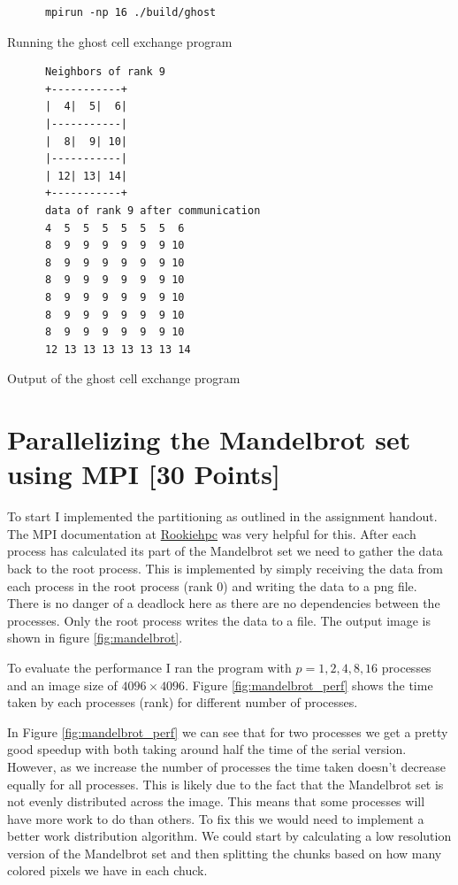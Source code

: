 \documentclass[unicode,11pt,a4paper,oneside,numbers=endperiod,openany]{scrartcl}
\begin{document}
\begin{listing}[h!t]
      \begin{verbatim}
      mpirun -np 16 ./build/ghost
      \end{verbatim}
      \caption{Running the ghost cell exchange program}
      \label{lst:ghost_run}
\end{listing}

\begin{listing}[h!t]
      \begin{verbatim}
      Neighbors of rank 9
      +-----------+
      |  4|  5|  6|
      |-----------|
      |  8|  9| 10|
      |-----------|
      | 12| 13| 14|
      +-----------+
      data of rank 9 after communication
      4  5  5  5  5  5  5  6 
      8  9  9  9  9  9  9 10 
      8  9  9  9  9  9  9 10 
      8  9  9  9  9  9  9 10 
      8  9  9  9  9  9  9 10 
      8  9  9  9  9  9  9 10 
      8  9  9  9  9  9  9 10 
      12 13 13 13 13 13 13 14 
      \end{verbatim}
      \caption{Output of the ghost cell exchange program}
      \label{lst:ghost_output}
\end{listing}


\section{Parallelizing the Mandelbrot set using MPI [30 Points]}

To start I implemented the partitioning as outlined in the assignment handout. The MPI documentation at \href{https://rookiehpc.org/mpi/docs/}{Rookiehpc} was very helpful for this. After each process has calculated its part of the Mandelbrot set we need to gather the data back to the root process. This is implemented by simply receiving the data from each process in the root process (rank 0) and writing the data to a png file. There is no danger of a deadlock here as there are no dependencies between the processes. Only the root process writes the data to a file. The output image is shown in figure \ref{fig:mandelbrot}.

To evaluate the performance I ran the program with $p = 1, 2, 4, 8, 16$ processes and an image size of $4096 \times 4096$. Figure \ref{fig:mandelbrot_perf} shows the time taken by each processes (rank) for different number of processes.

In Figure \ref{fig:mandelbrot_perf} we can see that for two processes we get a pretty good speedup with both taking around half the time of the serial version. However, as we increase the number of processes the time taken doesn't decrease equally for all processes. This is likely due to the fact that the Mandelbrot set is not evenly distributed across the image. This means that some processes will have more work to do than others. To fix this we would need to implement a better work distribution algorithm. We could start by calculating a low resolution version of the Mandelbrot set and then splitting the chunks based on how many colored pixels we have in each chuck.
\end{document}
